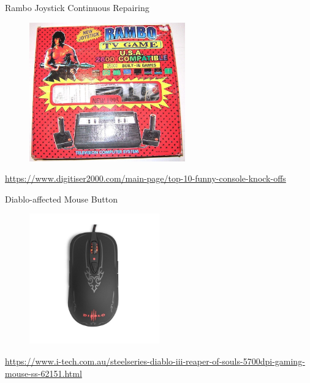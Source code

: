 \documentclass{simple}
\begin{document}
\begin{frame}{Rambo Joystick Continuous Repairing}
  \begin{figure}
    \centering
    \includegraphics[width=0.6\textwidth]{img/rambo-joystick}
  \end{figure}
  \begin{center}
    \tiny
    \url{https://www.digitiser2000.com/main-page/top-10-funny-console-knock-offs}
  \end{center}
\end{frame}

\begin{frame}{Diablo-affected Mouse Button}
  \begin{figure}
    \centering
    \includegraphics[width=0.5\textwidth]{img/diablo-mouse}
  \end{figure}
  \begin{center}
    \tiny
    \url{https://www.i-tech.com.au/steelseries-diablo-iii-reaper-of-souls-5700dpi-gaming-mouse-ss-62151.html}
  \end{center}
\end{frame}
\end{document}
